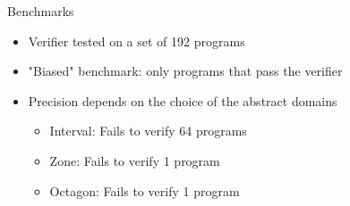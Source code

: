 \documentclass[aspectratio=169]{beamer}
\begin{document}
\begin{frame}{Benchmarks}
\begin{itemize}
    \item Verifier tested on a set of 192 programs
    \item "Biased" benchmark: only programs that pass the verifier
    \item Precision depends on the choice of the abstract domains
          \begin{itemize}
            \item Interval: Fails to verify 64 programs
            \item Zone: Fails to verify 1 program
            \item Octagon: Fails to verify 1 program
          \end{itemize}
  \end{itemize}
\end{frame}

\begin{frame}{}
\end{frame}
\end{document}
